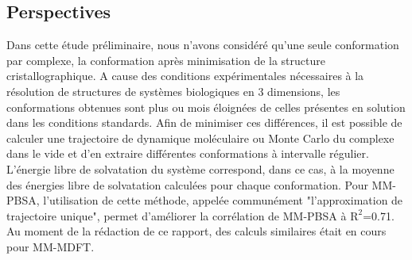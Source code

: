 \subsection{Perspectives}
Dans cette étude préliminaire, nous n'avons considéré qu'une seule conformation par complexe, la conformation après minimisation de la structure cristallographique. A cause des conditions expérimentales nécessaires à la résolution de structures de systèmes biologiques en 3 dimensions, les conformations obtenues sont plus ou mois éloignées de celles présentes en solution dans les conditions standards. Afin de minimiser ces différences, il est possible de calculer une trajectoire de dynamique moléculaire ou Monte Carlo du complexe dans le vide et d'en extraire différentes conformations à intervalle régulier. 
L'énergie libre de solvatation du système correspond, dans ce cas, à la moyenne des énergies libre de solvatation calculées pour chaque conformation. Pour MM-PBSA, l'utilisation de cette méthode, appelée communément "l'approximation de trajectoire unique", permet d'améliorer la corrélation de MM-PBSA à $\mathrm{R}^2$=0.71. Au moment de la rédaction de ce rapport, des calculs similaires était en cours pour MM-MDFT.



\clearpage
\strut
\vspace{10\baselineskip}




